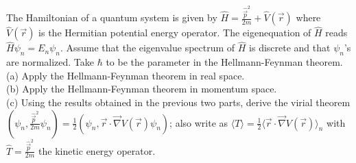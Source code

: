 \documentclass[12pt,a4paper]{article}
\newenvironment{problem}[2][Problem]{\begin{trivlist}
\item[\hskip \labelsep {\bfseries #1}\hskip \labelsep {\bfseries #2.}]}{\end{trivlist}}
\begin{document}
\begin{problem}{4}
The Hamiltonian of a quantum system is given by $\hat{H}=\frac{\hat{\vec{p}}^2}{2m}+\hat{V}(\vec{r})$ where $\hat{V}(\vec{r})$ is the Hermitian potential
energy operator. The eigenequation of $\hat{H}$ reads $\hat{H}\psi_n=E_n\psi_n$. Assume that the eigenvalue spectrum of $\hat{H}$ is discrete and that $\psi_n$'s are normalized. Take $\hbar$ to be the parameter in the Hellmann-Feynman theorem.\\
(a) Apply the Hellmann-Feynman theorem in real space.\\
(b) Apply the Hellmann-Feynman theorem in momentum space.\\
(c) Using the results obtained in the previous two parts, derive the virial theorem $(\psi_n,\frac{\hat{\vec{p}}^2}{2m}\psi_n)=\frac{1}{2}(\psi_n,\vec{r}\cdot\vec{\nabla}V(\vec{r})\psi_n)$; also write as $\langle T\rangle=\frac{1}{2}\langle\vec{r}\cdot\vec{\nabla}V(\vec{r})\rangle_n$ with $\hat{T}=\frac{\hat{\vec{p}}^2}{2m}$ the kinetic energy operator.
\end{problem}
\end{document}

